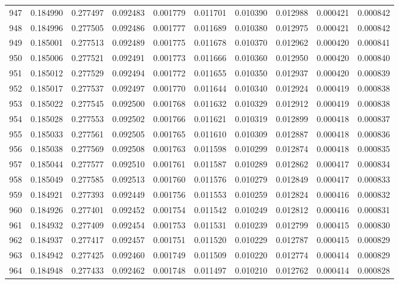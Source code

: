 \begin{tabular}{lrrrrrrrrr}
947 & 0.184990 & 0.277497 & 0.092483 & 0.001779 & 0.011701 & 0.010390 & 0.012988 & 0.000421 & 0.000842 \\
948 & 0.184996 & 0.277505 & 0.092486 & 0.001777 & 0.011689 & 0.010380 & 0.012975 & 0.000421 & 0.000842 \\
949 & 0.185001 & 0.277513 & 0.092489 & 0.001775 & 0.011678 & 0.010370 & 0.012962 & 0.000420 & 0.000841 \\
950 & 0.185006 & 0.277521 & 0.092491 & 0.001773 & 0.011666 & 0.010360 & 0.012950 & 0.000420 & 0.000840 \\
951 & 0.185012 & 0.277529 & 0.092494 & 0.001772 & 0.011655 & 0.010350 & 0.012937 & 0.000420 & 0.000839 \\
952 & 0.185017 & 0.277537 & 0.092497 & 0.001770 & 0.011644 & 0.010340 & 0.012924 & 0.000419 & 0.000838 \\
953 & 0.185022 & 0.277545 & 0.092500 & 0.001768 & 0.011632 & 0.010329 & 0.012912 & 0.000419 & 0.000838 \\
954 & 0.185028 & 0.277553 & 0.092502 & 0.001766 & 0.011621 & 0.010319 & 0.012899 & 0.000418 & 0.000837 \\
955 & 0.185033 & 0.277561 & 0.092505 & 0.001765 & 0.011610 & 0.010309 & 0.012887 & 0.000418 & 0.000836 \\
956 & 0.185038 & 0.277569 & 0.092508 & 0.001763 & 0.011598 & 0.010299 & 0.012874 & 0.000418 & 0.000835 \\
957 & 0.185044 & 0.277577 & 0.092510 & 0.001761 & 0.011587 & 0.010289 & 0.012862 & 0.000417 & 0.000834 \\
958 & 0.185049 & 0.277585 & 0.092513 & 0.001760 & 0.011576 & 0.010279 & 0.012849 & 0.000417 & 0.000833 \\
959 & 0.184921 & 0.277393 & 0.092449 & 0.001756 & 0.011553 & 0.010259 & 0.012824 & 0.000416 & 0.000832 \\
960 & 0.184926 & 0.277401 & 0.092452 & 0.001754 & 0.011542 & 0.010249 & 0.012812 & 0.000416 & 0.000831 \\
961 & 0.184932 & 0.277409 & 0.092454 & 0.001753 & 0.011531 & 0.010239 & 0.012799 & 0.000415 & 0.000830 \\
962 & 0.184937 & 0.277417 & 0.092457 & 0.001751 & 0.011520 & 0.010229 & 0.012787 & 0.000415 & 0.000829 \\
963 & 0.184942 & 0.277425 & 0.092460 & 0.001749 & 0.011509 & 0.010220 & 0.012774 & 0.000414 & 0.000829 \\
964 & 0.184948 & 0.277433 & 0.092462 & 0.001748 & 0.011497 & 0.010210 & 0.012762 & 0.000414 & 0.000828 \\

\end{tabular}
